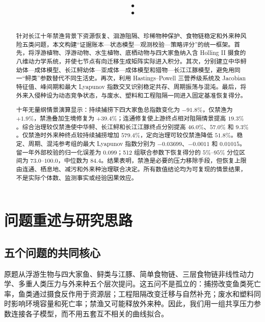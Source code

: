 \documentclass[withoutpreface,bwprint]{cumcmthesis}
\title{\papertitlemain：\papertitlesub}
\begin{document}
\maketitle

\begin{abstract}
针对长江十年禁渔背景下资源恢复、洄游阻隔、珍稀物种保护、食物链稳定和外来种风险五类问题，本文构建“证据账本—状态模型—观测校验—策略评分”的统一框架。首先，将浮游植物、浮游动物、水生植物、底栖动物与四大家鱼纳入含 Holling II 摄食的八维动力学系统，并使七节点有向迁移生成矩阵实际进入积分。其次，分别建立中华鲟幼体—成体模型、长江鲟幼体—亚成体—成体模型和猎物—长江江豚模型，避免用同一“鲟类”参数替代不同生活史。再次，利用 Hastings--Powell 三营养级系统及 Jacobian 特征值、峰间期和最大 Lyapunov 指数交叉识别稳定共存、周期振荡与混沌。最后，将外来入侵种设为动态竞争状态，与废水、塑料和工程阻隔一同进入固定基准恢复得分。

十年无量纲情景演算显示：持续捕捞下四大家鱼总指数变化为 $-91.8\%$，仅禁渔为 $+1.9\%$，禁渔叠加生境修复为 $+39.4\%$；连通修复使上游终点相对阻隔情景提高 $19.3\%$。综合治理较仅禁渔使中华鲟、长江鲟和长江江豚终点分别提高 $46.0\%$、$57.0\%$ 和 $9.3\%$。仅禁渔时外来种终点较持续捕捞增加 $579.4\%$，定向治理可较仅禁渔降低 $51.8\%$。稳定、周期、混沌参考组的最大 Lyapunov 指数分别为 $-0.03699$、$-0.0011$ 和 $0.01015$。留一年外部校验的归一化误差为 $0.099$；512 组联合参数下恢复得分的 $5\%$--$95\%$ 分位区间为 $73.0$--$100.0$，中位数为 $84.4$。结果表明，禁渔是必要的压力移除手段，但恢复上限由连通、栖息地、减污和外来种治理联合决定。所有数值结论均为可复现的情景结果，不是实际个体数、监测事实或经验因果效应。

\end{abstract}


\section{问题重述与研究思路}

\subsection{五个问题的共同核心}

原题从浮游生物与四大家鱼、鲟类与江豚、简单食物链、三层食物链非线性动力学、多重人类压力与外来种五个层次提问。这五问不是孤立的：捕捞改变鱼类死亡率，鱼类通过摄食反作用于资源层；工程阻隔改变迁移与自然补充；废水和塑料同时影响环境容量和死亡率；禁渔又可能释放外来种。因此，我们用一组共享压力参数连接各子模型，而不用五套互不相关的曲线拟合。\AIassistmark
\end{document}
